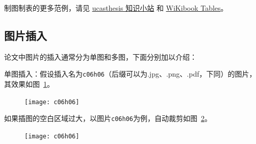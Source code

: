 制图制表的更多范例，请见 \href{https://github.com/mohuangrui/ucasthesis/wiki}{ucasthesis 知识小站} 和 \href{https://en.wikibooks.org/wiki/LaTeX/Tables}{WiKibook Tables}。

\subsection{图片插入}

论文中图片的插入通常分为单图和多图，下面分别加以介绍：

单图插入：假设插入名为\verb|c06h06|（后缀可以为.jpg、.png、.pdf，下同）的图片，其效果如图~\ref{fig:c06h06}。
\begin{figure}[!htbp]
    \centering
    \texttt{[image: c06h06]}
    \label{fig:c06h06}
\end{figure}

如果插图的空白区域过大，以图片\verb|c06h06|为例，自动裁剪如图~\ref{fig:c06h06_trim}。
\begin{figure}[!htbp]
    \centering
    \texttt{[image: c06h06]}
    \label{fig:c06h06_trim}
\end{figure}

